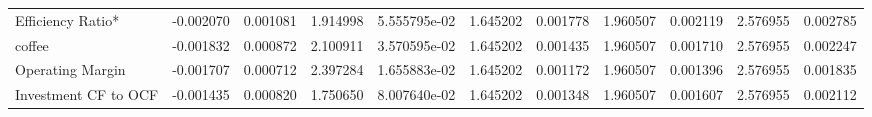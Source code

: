 \documentclass[12pt,a4paper,english]{article}
\begin{document}
{{\begin{tabular}{@{}lrrrrrrrrrr@{}}
			Efficiency Ratio*              & -0.002070                & 0.001081                    & 1.914998                  & 5.555795e-02                             & 1.645202                      & 0.001778                      & 1.960507                     & 0.002119                     & 2.576955                     & 0.002785                     \\
			coffee                         & -0.001832                & 0.000872                    & 2.100911                  & 3.570595e-02                             & 1.645202                      & 0.001435                      & 1.960507                     & 0.001710                     & 2.576955                     & 0.002247                     \\
			Operating Margin               & -0.001707                & 0.000712                    & 2.397284                  & 1.655883e-02                             & 1.645202                      & 0.001172                      & 1.960507                     & 0.001396                     & 2.576955                     & 0.001835                     \\
			Investment CF to OCF           & -0.001435                & 0.000820                    & 1.750650                  & 8.007640e-02                             & 1.645202                      & 0.001348                      & 1.960507                     & 0.001607                     & 2.576955                     & 0.002112                     \\ \bottomrule
		\end{tabular}%
	}
}
\end{document}
